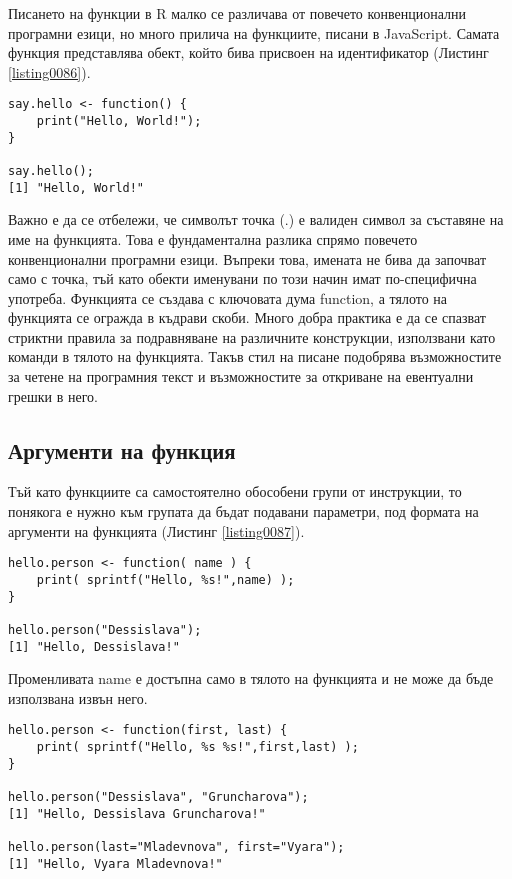 Писането на функции в R малко се различава от повечето конвенционални програмни езици, но много прилича на функциите, писани в JavaScript. Самата функция представлява обект, който бива присвоен на идентификатор (Листинг \ref{listing0086}).

\begin{lstlisting}[caption=Примерна потребителска функция, label=listing0086]
say.hello <- function() {
	print("Hello, World!");
}

say.hello();
[1] "Hello, World!"
\end{lstlisting}

Важно е да се отбележи, че символът точка (.) е валиден символ за съставяне на име на функцията. Това е фундаментална разлика спрямо повечето конвенционални програмни езици. Въпреки това, имената не бива да започват само с точка, тъй като обекти именувани по този начин имат по-специфична употреба. Функцията се създава с ключовата дума function, а тялото на функцията се огражда в къдрави скоби. Много добра практика е да се спазват стриктни правила за подравняване на различните конструкции, използвани като команди в тялото на функцията. Такъв стил на писане подобрява възможностите за четене на програмния текст и възможностите за откриване на евентуални грешки в него.

\subsection{Аргументи на функция}

Тъй като функциите са самостоятелно обособени групи от инструкции, то понякога е нужно към групата да бъдат подавани параметри, под формата на аргументи на функцията (Листинг \ref{listing0087}).

\begin{lstlisting}[caption=Извикване на функция с аргумент, label=listing0087]
hello.person <- function( name ) {
	print( sprintf("Hello, %s!",name) );
}

hello.person("Dessislava");
[1] "Hello, Dessislava!"
\end{lstlisting}

Променливата name е достъпна само в тялото на функцията и не може да бъде използвана извън него.

\begin{lstlisting}[caption=Извикване на функция с повече аргументи, label=listing0088]
hello.person <- function(first, last) {
	print( sprintf("Hello, %s %s!",first,last) );
}

hello.person("Dessislava", "Gruncharova");
[1] "Hello, Dessislava Gruncharova!"

hello.person(last="Mladevnova", first="Vyara");
[1] "Hello, Vyara Mladevnova!"
\end{lstlisting}

